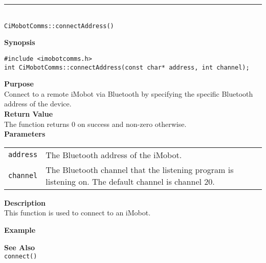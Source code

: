 \noindent
\vspace{5pt}
\rule{4.5in}{0.015in} \\
\noindent
{\LARGE \texttt{CiMobotComms::connectAddress()}}\\
{}

\noindent
{\bf Synopsis}\\
\begin{verbatim}
#include <imobotcomms.h>
int CiMobotComms::connectAddress(const char* address, int channel);
\end{verbatim}

\noindent
{\bf Purpose}\\
Connect to a remote iMobot via Bluetooth by specifying the specific Bluetooth
address of the device.\\

\noindent
{\bf Return Value}\\
The function returns 0 on success and non-zero otherwise.\\

\noindent
{\bf Parameters}
\vspace{-0.1in}
\begin{description}
\item               
\begin{tabular}{p{15 mm}p{145 mm}}
\texttt{address} & The Bluetooth address of the iMobot. \\
\texttt{channel} & The Bluetooth channel that the listening program is
listening on. The default channel is channel 20. \\
\end{tabular}
\end{description}

\noindent
{\bf Description}\\
This function is used to connect to an iMobot. 

\noindent
{\bf Example}\\
\noindent

\noindent
{\bf See Also}\\
\texttt{connect()}

